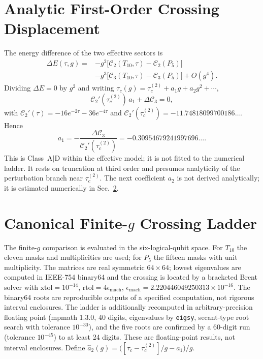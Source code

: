 \documentclass[10pt,twocolumn]{article}
\theoremstyle{definition}
\newcommand{\Tten}{T_{10}}
\newcommand{\Pfive}{P_5}
\newcommand{\tauc}{\tau_c^{(2)}}
\begin{document}
\section{Analytic First-Order Crossing Displacement}
The energy difference of the two effective sectors is
\[
\begin{aligned}\Delta E(\tau,g)=&-g^2\bigl[\mathcal C_2(\Tten,\tau)-\mathcal C_2(\Pfive)\bigr]\\&-g^3\bigl[\mathcal C_3(\Tten,\tau)-\mathcal C_3(\Pfive)\bigr]+O(g^4).\end{aligned}
\]
Dividing $\Delta E=0$ by $g^2$ and writing $\tau_c(g)=\tauc+a_1g+a_2g^2+\cdots$,
\begin{equation}
\mathcal C_2'(\tauc)\,a_1+\Delta\mathcal C_3=0 ,\label{eq:cross1}
\end{equation}
with $\mathcal C_2'(\tau)=-16e^{-2\tau}-36e^{-4\tau}$ and $\mathcal C_2'(\tauc)=-11.74818099700186\ldots$. Hence
\begin{equation}
a_1=-\frac{\Delta\mathcal C_3}{\mathcal C_2'(\tauc)}=-0.30954679241997696\ldots.\label{eq:a1}
\end{equation}
This is Class~A$|$D within the effective model; it is not fitted to the numerical ladder. It rests on truncation at third order and presumes analyticity of the perturbation branch near $\tauc$. The next coefficient $a_2$ is not derived analytically; it is estimated numerically in Sec.~\ref{sec:ladder}.

\section{Canonical Finite-$g$ Crossing Ladder}\label{sec:ladder}
The finite-$g$ comparison is evaluated in the six-logical-qubit space. For $\Tten$ the eleven masks and multiplicities are used; for $\Pfive$ the fifteen masks with unit multiplicity. The matrices are real symmetric $64\times64$; lowest eigenvalues are computed in IEEE-754 binary64 and the crossing is located by a bracketed Brent solver with $\mathrm{xtol}=10^{-14}$, $\mathrm{rtol}=4\epsilon_{\mathrm{mach}}$, $\epsilon_{\mathrm{mach}}=2.220446049250313\times10^{-16}$. The binary64 roots are reproducible outputs of a specified computation, not rigorous interval enclosures. The ladder is additionally recomputed in arbitrary-precision floating point (mpmath 1.3.0, 40 digits, eigenvalues by \texttt{eigsy}, secant-type root search with tolerance $10^{-30}$), and the five roots are confirmed by a 60-digit run (tolerance $10^{-45}$) to at least 24 digits. These are floating-point results, not interval enclosures. Define $\hat a_2(g)=\bigl([\tau_c-\tauc]/g-a_1\bigr)/g$.
\end{document}
